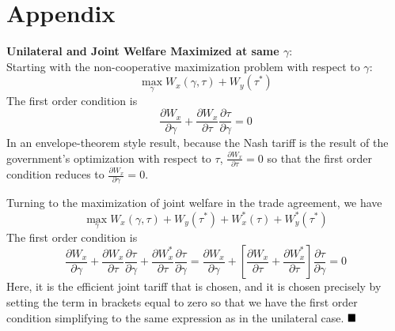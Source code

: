 \documentclass[12pt]{article}
\newcommand{\ga}{\gamma}
\begin{document}
\section{Appendix}
\noindent \textbf{\hypertarget{envelope}{Unilateral and Joint Welfare Maximized at same $\ga$}}: \\
Starting with the non-cooperative maximization problem with respect to $\ga$:
\[
 \max_{\ga} W_x(\ga,\tau) + W_y(\tau^*)
\]
The first order condition is
\[
	\frac{\partial W_x}{\partial \ga} + \frac{\partial W_x}{\partial \tau}\frac{\partial \tau}{\partial \ga} = 0
\]
In an envelope-theorem style result, because the Nash tariff is the result of the government's optimization with respect to $\tau$, $\frac{\partial W_x}{\partial \tau}=0$ so that the first order condition reduces to $\frac{\partial W_x}{\partial \ga} = 0$.
				
Turning to the maximization of joint welfare in the trade agreement, we have
\[
  \max_{\ga} W_x(\ga,\tau) + W_y(\tau^*) + W_x^*(\tau)+ W_y^*(\tau^*)
\]
The first order condition is 
\[
  \frac{\partial W_x}{\partial \ga} + \frac{\partial W_x}{\partial \tau}\frac{\partial \tau}{\partial \ga} + \frac{\partial W_x^*}{\partial \tau}\frac{\partial \tau}{\partial \ga} = \frac{\partial W_x}{\partial \ga} + \left[ \frac{\partial W_x}{\partial \tau} + \frac{\partial W_x^*}{\partial \tau}\right]\frac{\partial \tau}{\partial \ga} = 0
\]
Here, it is the efficient joint tariff that is chosen, and it is chosen precisely by setting the term in brackets equal to zero so that we have the first order condition simplifying to the same expression as in the unilateral case. $\hfill\blacksquare$
\end{document}
